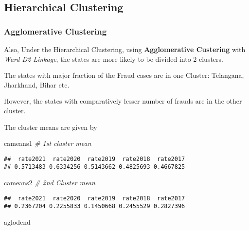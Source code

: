 \documentclass[
  12,
  a4paper,
]{report}
\newenvironment{Shaded}{\begin{snugshade}}{\end{snugshade}}
\newcommand{\CommentTok}[1]{\textcolor[rgb]{0.56,0.35,0.01}{\textit{#1}}}
\newcommand{\NormalTok}[1]{#1}
\begin{document}
\hypertarget{hierarchical-clustering}{%
\subsection{Hierarchical Clustering}\label{hierarchical-clustering}}

\hypertarget{agglomerative-clustering}{%
\subsubsection{Agglomerative
Clustering}\label{agglomerative-clustering}}

Also, Under the Hierarchical Clustering, using \textbf{Agglomerative
Custering} with \emph{Ward D2 Linkage}, the states are more likely to be
divided into 2 clusters.

The states with major fraction of the Fraud cases are in one Cluster:
Telangana, Jharkhand, Bihar etc.

However, the states with comparatively lesser number of frauds are in
the other cluster.

The cluster means are given by

\begin{Shaded}
\begin{Highlighting}[]
\NormalTok{cameans1 }\CommentTok{\# 1st cluster mean}
\end{Highlighting}
\end{Shaded}

\begin{verbatim}
##  rate2021  rate2020  rate2019  rate2018  rate2017 
## 0.5713483 0.6334256 0.5143662 0.4825693 0.4667825
\end{verbatim}

\begin{Shaded}
\begin{Highlighting}[]
\NormalTok{cameans2 }\CommentTok{\# 2nd Cluster mean}
\end{Highlighting}
\end{Shaded}

\begin{verbatim}
##  rate2021  rate2020  rate2019  rate2018  rate2017 
## 0.2367204 0.2255833 0.1450668 0.2455529 0.2827396
\end{verbatim}

\begin{Shaded}
\begin{Highlighting}[]
\NormalTok{aglodend}
\end{Highlighting}
\end{Shaded}
\end{document}
